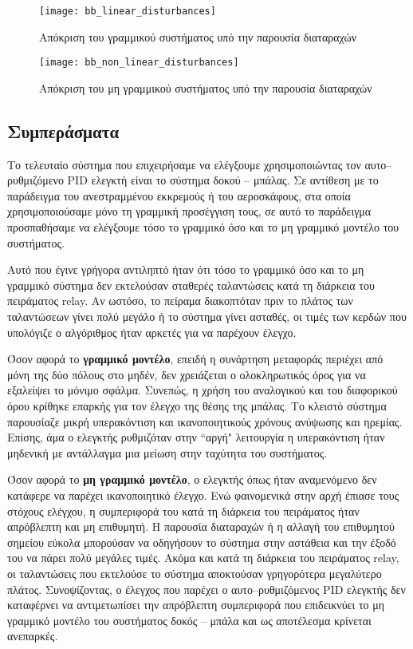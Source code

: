 \begin{figure}[h]
  \centering
  \texttt{[image: bb\_linear\_disturbances]}
  \caption{Απόκριση του γραμμικού συστήματος υπό την παρουσία διαταραχών}
  \label{fig:bb_linear_disturbances}
\end{figure}

\begin{figure}[h]
  \centering
  \texttt{[image: bb\_non\_linear\_disturbances]}
  \caption{Απόκριση του μη γραμμικού συστήματος υπό την παρουσία διαταραχών}
  \label{fig:bb_non_linear_disturbances}
\end{figure}

\subsection{Συμπεράσματα}

Το τελευταίο σύστημα που επιχειρήσαμε να ελέγξουμε χρησιμοποιώντας τον αυτο--ρυθμιζόμενο PID ελεγκτή είναι το σύστημα δοκού -- μπάλας. Σε αντίθεση με το παράδειγμα του ανεστραμμένου εκκρεμούς ή του αεροσκάφους, στα οποία χρησιμοποιούσαμε μόνο τη γραμμική προσέγγιση τους, σε αυτό το παράδειγμα προσπαθήσαμε να ελέγξουμε τόσο το γραμμικό όσο και το μη γραμμικό μοντέλο του συστήματος.

Αυτό που έγινε γρήγορα αντιληπτό ήταν ότι τόσο το γραμμικό όσο και το μη γραμμικό σύστημα δεν εκτελούσαν σταθερές ταλαντώσεις κατά τη διάρκεια του πειράματος relay. Αν ωστόσο, το πείραμα διακοπτόταν πριν το πλάτος των ταλαντώσεων γίνει πολύ μεγάλο ή το σύστημα γίνει ασταθές, οι τιμές των κερδών που υπολόγιζε ο αλγόριθμος ήταν αρκετές για να παρέχουν έλεγχο.

Όσον αφορά το \textbf{γραμμικό μοντέλο}, επειδή η συνάρτηση μεταφοράς περιέχει από μόνη της δύο πόλους στο μηδέν, δεν χρειάζεται ο ολοκληρωτικός όρος για να εξαλείψει το μόνιμο σφάλμα. Συνεπώς, η χρήση του αναλογικού και του διαφορικού όρου κρίθηκε επαρκής για τον έλεγχο της θέσης της μπάλας. Το κλειστό σύστημα παρουσίαζε μικρή υπερακόντιση και ικανοποιητικούς χρόνους ανύψωσης και ηρεμίας. Επίσης, άμα ο ελεγκτής ρυθμιζόταν στην ``αργή" λειτουργία η υπερακόντιση ήταν μηδενική με αντάλλαγμα μια μείωση στην ταχύτητα του συστήματος.

Όσον αφορά το \textbf{μη γραμμικό μοντέλο}, ο ελεγκτής όπως ήταν αναμενόμενο δεν κατάφερε να παρέχει ικανοποιητικό έλεγχο. Ενώ φαινομενικά στην αρχή έπιασε τους στόχους ελέγχου, η συμπεριφορά του κατά τη διάρκεια του πειράματος ήταν απρόβλεπτη και μη επιθυμητή. Η παρουσία διαταραχών ή η αλλαγή του επιθυμητού σημείου εύκολα μπορούσαν να οδηγήσουν το σύστημα στην αστάθεια και την έξοδό του να πάρει πολύ μεγάλες τιμές. Ακόμα και κατά τη διάρκεια του πειράματος relay, οι ταλαντώσεις που εκτελούσε το σύστημα αποκτούσαν γρηγορότερα μεγαλύτερο πλάτος. Συνοψίζοντας, ο έλεγχος που παρέχει ο αυτο--ρυθμιζόμενος PID ελεγκτής δεν καταφέρνει να αντιμετωπίσει την απρόβλεπτη συμπεριφορά που επιδεικνύει το μη γραμμικό μοντέλο του συστήματος δοκός -- μπάλα και ως αποτέλεσμα κρίνεται ανεπαρκές. \newpage

